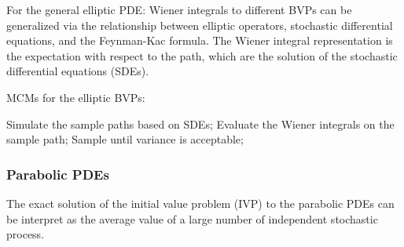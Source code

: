 For the general elliptic PDE: Wiener integrals to different BVPs can
be generalized via the relationship between elliptic operators,
stochastic differential equations, and the Feynman-Kac formula. The
Wiener integral representation is the expectation with respect to the
path, which are the solution of the stochastic differential equations (SDEs). 


MCMs for the elliptic BVPs:

Simulate the sample paths based on SDEs;
Evaluate the Wiener integrals on the sample path;
Sample until variance is acceptable;


\subsubsection{Parabolic PDEs}


The exact solution of the initial value problem (IVP) to the parabolic
PDEs can be interpret as the average value of a large number of
independent stochastic process.













